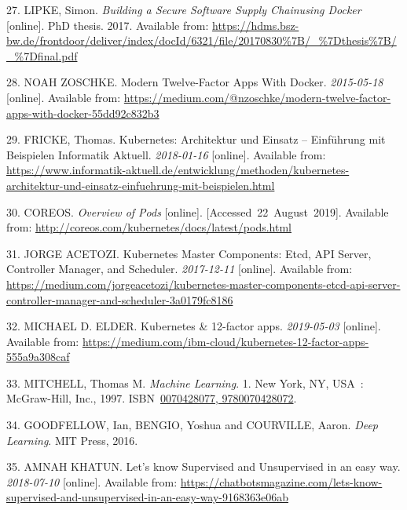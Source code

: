 \documentclass[12pt,english,a4paper,oneside,,tablecaptionabove]{scrbook}
\begin{document}
\leavevmode\hypertarget{ref-Lipke2017}{}%
27. LIPKE, Simon. \emph{Building a Secure Software Supply Chainusing
Docker} {[}online{]}. PhD thesis. 2017. Available from:
\url{https://hdms.bsz-bw.de/frontdoor/deliver/index/docId/6321/file/20170830\%7B/_\%7Dthesis\%7B/_\%7Dfinal.pdf}

\leavevmode\hypertarget{ref-NoahZoschke}{}%
28. NOAH ZOSCHKE. Modern Twelve-Factor Apps With Docker.
\emph{2015-05-18} {[}online{]}. Available from:
\url{https://medium.com/@nzoschke/modern-twelve-factor-apps-with-docker-55dd92c832b3}

\leavevmode\hypertarget{ref-Fricke}{}%
29. FRICKE, Thomas. Kubernetes: Architektur und Einsatz -- Einführung
mit Beispielen \textbar{} Informatik Aktuell. \emph{2018-01-16}
{[}online{]}. Available from:
\url{https://www.informatik-aktuell.de/entwicklung/methoden/kubernetes-architektur-und-einsatz-einfuehrung-mit-beispielen.html}

\leavevmode\hypertarget{ref-CoreOS}{}%
30. COREOS. \emph{Overview of Pods} {[}online{]}.
{[}Accessed~22~August~2019{]}. Available from:
\url{http://coreos.com/kubernetes/docs/latest/pods.html}

\leavevmode\hypertarget{ref-JorgeAcetozi}{}%
31. JORGE ACETOZI. Kubernetes Master Components: Etcd, API Server,
Controller Manager, and Scheduler. \emph{2017-12-11} {[}online{]}.
Available from:
\url{https://medium.com/jorgeacetozi/kubernetes-master-components-etcd-api-server-controller-manager-and-scheduler-3a0179fc8186}

\leavevmode\hypertarget{ref-MichaelD.Elder}{}%
32. MICHAEL D. ELDER. Kubernetes \& 12-factor apps. \emph{2019-05-03}
{[}online{]}. Available from:
\url{https://medium.com/ibm-cloud/kubernetes-12-factor-apps-555a9a308caf}

\leavevmode\hypertarget{ref-Mitchell:1997:ML:541177}{}%
33. MITCHELL, Thomas M. \emph{Machine Learning}. 1. New York, NY, USA~:
McGraw-Hill, Inc., 1997.
ISBN~\href{https://worldcat.org/isbn/0070428077,\%209780070428072}{0070428077, 9780070428072}.

\leavevmode\hypertarget{ref-Goodfellow-et-al-2016}{}%
34. GOODFELLOW, Ian, BENGIO, Yoshua and COURVILLE, Aaron. \emph{Deep
Learning}. MIT Press, 2016.

\leavevmode\hypertarget{ref-AmnahKhatun}{}%
35. AMNAH KHATUN. Let's know Supervised and Unsupervised in an easy way.
\emph{2018-07-10} {[}online{]}. Available from:
\url{https://chatbotsmagazine.com/lets-know-supervised-and-unsupervised-in-an-easy-way-9168363e06ab}
\end{document}
